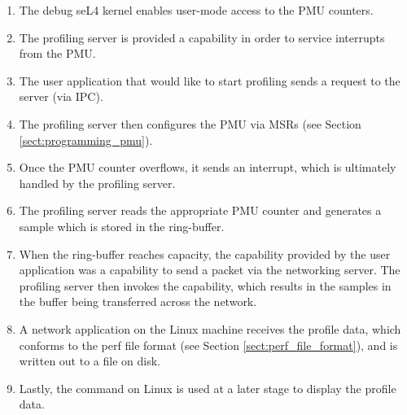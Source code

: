 \ssp\begin{enumerate}
    \item The debug seL4 kernel enables user-mode access to the PMU counters.
    \item The profiling server is provided a capability in order to service interrupts from the PMU.
    \item The user application that would like to start profiling sends a request to the server (via IPC).
    \item The profiling server then configures the PMU via MSRs (see Section \ref{sect:programming_pmu}).
    \item Once the PMU counter overflows, it sends an interrupt, which is ultimately handled by the profiling server.
    \item The profiling server reads the appropriate PMU counter and generates a sample which is stored in the ring-buffer.
    \item When the ring-buffer reaches capacity, the capability provided by the user application was a capability to send a packet via the networking server. The profiling server then invokes the capability, which results in the samples in the buffer being transferred across the network.
    \item A network application on the Linux machine receives the profile data, which conforms to the perf file format (see Section \ref{sect:perf_file_format}), and is written out to a file on disk.
    \item Lastly, the  command on Linux is used at a later stage to display the profile data.
\end{enumerate}\dsp